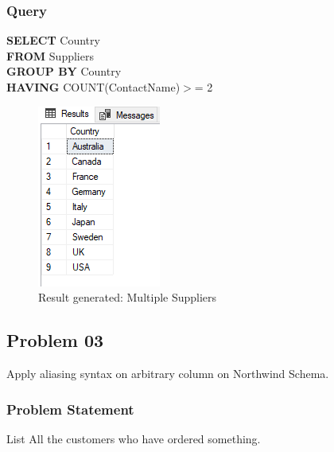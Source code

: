\documentclass[12pt,a4paper]{report}
\begin{document}
\subsubsection{Query}
\begin{center}
	\begin{minipage}{12cm}
		\textbf{SELECT} Country\\
		\textbf{FROM} Suppliers\\
		\textbf{GROUP BY} Country \\
		\textbf{HAVING} COUNT(ContactName)$ >$= 2
	\end{minipage}
	\begin{figure}[h]
	\centering
		\includegraphics[scale=1]{images/5.png}
		\caption{Result generated: Multiple Suppliers}
	\end{figure}
\end{center}

\subsection{Problem 03}
Apply aliasing syntax on arbitrary column on Northwind Schema.
\subsubsection{Problem Statement}
List All the customers who have ordered something.
\end{document}
